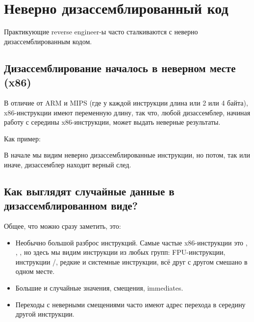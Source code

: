 \section{Неверно дизассемблированный код}
\label{sec:incorrectly_disasmed_code}

Практикующие reverse engineer-ы часто сталкиваются с неверно дизассемблированным кодом.

\subsection{Дизассемблирование началось в неверном месте (x86)}

В отличие от ARM и MIPS (где у каждой инструкции длина или 2 или 4 байта), x86-инструкции имеют переменную длину,
так что, любой дизассемблер, начиная работу с середины x86-инструкции, может выдать неверные результаты.

Как пример:



В начале мы видим неверно дизассемблированные инструкции, но потом, так или иначе, дизассемблер находит верный след.

\subsection{Как выглядят случайные данные в дизассемблированном виде?}

Общее, что можно сразу заметить, это:

\begin{itemize}
\item Необычно большой разброс инструкций.
Самые частые x86-инструкции это \PUSH{}, \MOV{}, \CALL{}, 
но здесь мы видим
инструкции из любых групп: \ac{FPU}-инструкции, инструкции /, редкие и системные инструкции, всё друг с другом смешано в одном месте.

\item Большие и случайные значения, смещения, immediates.

\item Переходы с неверными смещениями часто имеют адрес перехода в середину другой инструкции.
\end{itemize}



